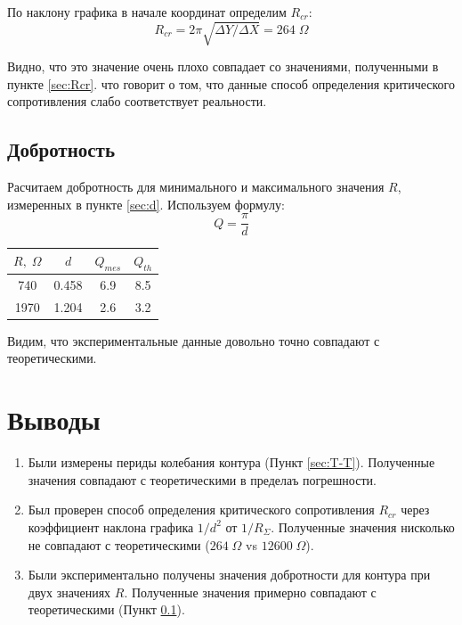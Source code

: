 \documentclass{article}
\begin{document}
По наклону графика в начале координат определим \(R_{cr}\):
\[ R_{cr} = 2\pi\sqrt{\Delta Y / \Delta X} = 264\; \Omega \]

Видно, что это значение очень плохо совпадает со значениями, полученными в пункте \ref{sec:Rcr}. что говорит о
том, что данные способ определения критического сопротивления слабо соответствует реальности.

\subsection{Добротность} \label{sec:Q}
Расчитаем добротность для минимального и максимального значения \(R\), измеренных в пункте \ref{sec:d}. Используем формулу:
\[ Q = \frac{\pi}{d} \]
\begin{table}[H]
    \centering
    \begin{tabular}{|c|c|c|c|}
        \hline
    \(R,\; \Omega\) & \(d\) & \( Q_{mes} \) & \(Q_{th}\)\\\hline
    740  & 0.458 & 6.9 & 8.5 \\\hline
    1970 & 1.204 & 2.6 & 3.2 \\\hline
    \end{tabular}
\end{table}

Видим, что экспериментальные данные довольно точно совпадают с теоретическими.
\section{Выводы}
\begin{enumerate}
    \item Были измерены периды колебания контура (Пункт \ref{sec:T-T}). Полученные значения совпадают с теоретическими в пределаъ погрешности.
    \item Был проверен способ определения критического сопротивления \(R_{cr}\) через коэффициент наклона графика
\(1/d^2\) от \(1/R_{\Sigma}\). Полученные значения нисколько не совпадают с теоретическими (\(264\; \Omega\) vs \(12600\; \Omega\)).
    \item Были экспериментально получены значения добротности для контура при двух значениях \(R\). Полученные значения примерно совпадают с
теоретическими (Пункт \ref{sec:Q}). 
\end{enumerate}
\end{document}
